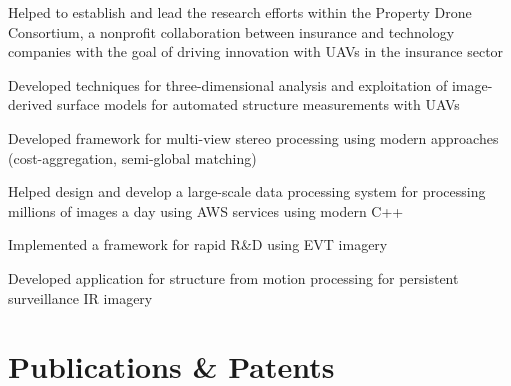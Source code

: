 \documentclass[]{nilosek-resume}
\begin{document}
\begin{minipage}[t]{0.7\textwidth}
\begin{tightemize}
	\item Helped to establish and lead the research efforts within the Property Drone Consortium, a nonprofit collaboration between insurance and technology companies with the goal of driving innovation with UAVs in the insurance sector
	\item Developed techniques for three-dimensional analysis and exploitation of image-derived surface models for automated structure measurements with UAVs
	\item Developed framework for multi-view stereo processing using modern approaches (cost-aggregation, semi-global matching)
	\item Helped design and develop a large-scale data processing system for processing millions of images a day using AWS services using modern C++
	\item Implemented a framework for rapid R\&D using EVT imagery 
\end{tightemize}
\sectionsep

\begin{tightemize}
	\item Developed application for structure from motion processing for persistent surveillance IR imagery
\end{tightemize}


\section{Publications \& Patents}
\renewcommand\refname{\vskip - 0.8cm} %


\nocite{*}


\end{minipage} 
\end{document}
